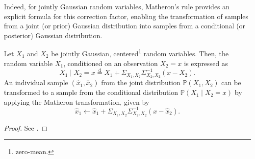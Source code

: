 

Indeed, for jointly Gaussian random variables, Matheron's rule \parencite{journel1976mining, chiles2012geostatistics, wilson2021pathwise} provides an explicit formula for this correction factor, enabling the transformation of samples from a joint (or prior) Gaussian distribution into samples from a conditional (or posterior) Gaussian distribution.

\begin{theorem}
    \label{thm:matherons_rule}
Let $X_1$ and $X_2$ be jointly Gaussian, centered\footnote{zero-mean.} random variables. Then, the random variable $X_1$, conditioned on an observation $X_2 = x$ is expressed as
\[
    X_1 \mid X_2 = x \stackrel{\mathrm{d}}{=} X_1 + \Sigma_{X_1, X_2} \Sigma_{X_2, X_2}^{-1} (x - X_2).
\]
An individual sample $(\hat{x}_1, \hat{x}_2)$ from the joint distribution $\mathbb{P}(X_1, X_2)$ can be transformed to a sample from the conditional distribution $\mathbb{P}(X_1 \mid X_2 = x)$ by applying the Matheron transformation, given by
\[
    \hat{x}_1 \leftarrow \hat{x}_1 + \Sigma_{X_1, X_2} \Sigma_{X_2, X_2}^{-1} (x - \hat{x}_2).
\]
\end{theorem}
\begin{proof}
See \textcite[Theorem 1, Pg. 4]{wilson2021pathwise}.
\end{proof}

